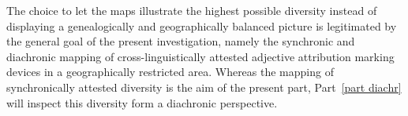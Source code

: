 The choice to let the maps illustrate the highest possible diversity instead of displaying a genealogically and geographically balanced picture is legitimated by the general goal of the present investigation, namely the synchronic and diachronic mapping of cross-linguistically attested adjective attribution marking devices in a geographically restricted area. Whereas the mapping of synchronically attested diversity is the aim of the present part, Part~\ref{part diachr} will inspect this diversity form a diachronic perspective.
